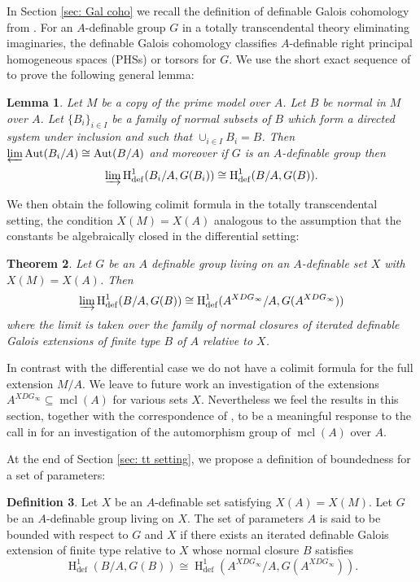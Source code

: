 \documentclass{amsart}
\newtheorem{theorem}{Theorem}[section]
\newtheorem{lemma}[theorem]{Lemma}
\theoremstyle{definition}
\newtheorem{definition}[theorem]{Definition}
\theoremstyle{remark}
\numberwithin{equation}{section}
\def \defin {\operatorname{def}}
\def \HH {\operatorname{H}}
\def \aut {\text{Aut}}
\def \mcl {\operatorname{mcl}}
\begin{document}
In Section \ref{sec: Gal coho} we recall the definition of definable Galois cohomology from \cite{pillay1997}. For an $A$-definable group $G$ in a totally transcendental theory eliminating imaginaries, the definable Galois cohomology classifies
$A$-definable right principal homogeneous spaces (PHSs) or torsors for $G$. We use the short exact sequence of \cite{MERETZKY_SES} to prove the following general lemma: 

\begin{lemma}
    Let $M$ be a copy of the prime model over $A$. Let $B$ be normal in $M$ over $A$. Let $\{B_i\}_{i \in I}$ be a family of normal subsets of $B$ which form a directed system under inclusion and such that $\cup_{i \in I}B_i = B$. Then $\varprojlim \aut(B_i/A) \cong \aut(B/A)$ and moreover if $G$ is an $A$-definable group then $$\varinjlim \HH^1_{\defin}(B_i/A,G(B_i)) \cong \HH^1_{\defin}(B/A,G(B)).$$
\end{lemma}

We then obtain the following colimit formula in the totally transcendental setting, the condition $X(M)=X(A)$ analogous to the assumption that the constants be algebraically closed in the differential setting:

\begin{theorem}\relax
    Let $G$ be an $A$ definable group living on an $A$-definable set $X$ with $X(M)=X(A)$. Then $$\varinjlim \HH^{1}_{\defin}(B/A, G(B)) \cong \HH^{1}_{\defin}(A^{XDG_\infty}/A, G(A^{XDG_\infty}))$$ where the limit is taken over the family of normal closures of iterated definable Galois extensions of finite type $B$ of $A$ relative to $X$.
\end{theorem}

In contrast with the differential case we do not have a colimit formula for the full extension $M/A$. We leave to future work an investigation of the extensions $A^{XDG_\infty} \subseteq \mcl(A)$ for various sets $X$. Nevertheless we feel the results in this section, together with the correspondence of \cite{meretzky2026galoistheoryautomorphismgroups}, to be a meaningful response to the call in \cite{PoizatPrime} for an investigation of the automorphism group of $\mcl(A)$ over $A$. 

At the end of Section \ref{sec: tt setting}, we propose a definition of boundedness for a set of parameters:

\begin{definition}
    Let $X$ be an $A$-definable set satisfying $X(A)= X(M)$. Let $G$ be an $A$-definable group living on $X$.  The set of parameters $A$ is said to be bounded with respect to $G$ and $X$ if there exists an iterated definable Galois extension of finite type relative to $X$ whose normal closure $B$ satisfies $$\HH^{1}_{\defin}(B/A, G(B)) \cong \HH^{1}_{\defin}(A^{XDG_\infty}/A, G(A^{XDG_\infty})).$$
\end{definition}
\end{document}
